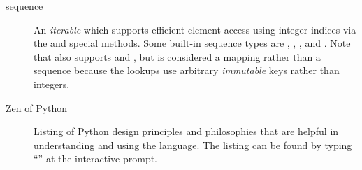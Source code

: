 \begin{description}
\item[sequence]
An \emph{iterable} which supports efficient element access using
integer indices via the  and
{} special methods.  Some built-in sequence types
are , , , and .
Note that  also supports  and
{}, but is considered a mapping rather than a
sequence because the lookups use arbitrary \emph{immutable} keys
rather than integers.

\item[Zen of Python]
Listing of Python design principles and philosophies that are helpful
in understanding and using the language.  The listing can be found by
typing ``'' at the interactive prompt.

\end{description}
